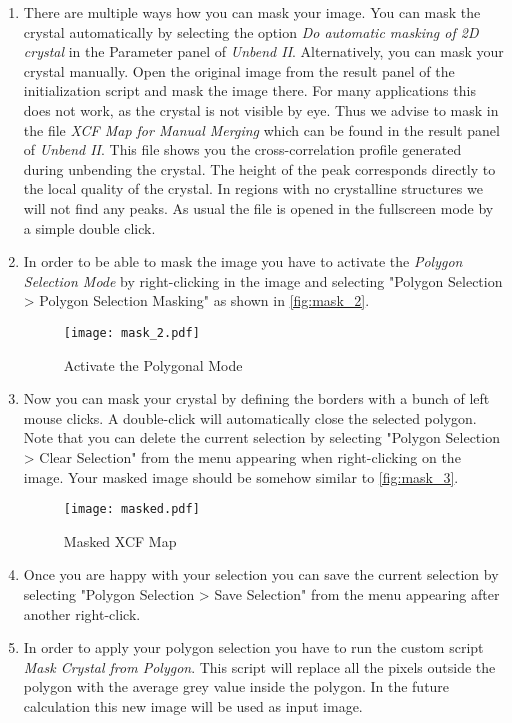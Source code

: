 \begin{enumerate}
	\item There are multiple ways how you can mask your image. You can mask the crystal automatically by selecting the option \textit{Do automatic masking of 2D crystal} in the Parameter panel of  \textit{Unbend II}. 
Alternatively, you can mask your crystal manually.  Open the original image from the result panel of the initialization script and mask the image there. For many applications this does not work, as the crystal is not visible by eye. Thus we advise to mask in the file \textit{XCF Map for Manual Merging} which can be found in the result panel of \textit{Unbend II}. This file shows you the cross-correlation profile generated during unbending the crystal. The height of the peak corresponds directly to the local quality of the crystal. In regions with no crystalline structures we will not find any peaks. As usual the file is opened in the fullscreen mode by a simple double click. 	
	\item In order to be able to mask the image you have to activate the \textit{Polygon Selection Mode} by right-clicking in the image and selecting "Polygon Selection > Polygon Selection Masking" as shown in \autoref{fig:mask_2}.

	\begin{figure}[H]
		\centering
		\texttt{[image: mask\_2.pdf]}
		\caption{Activate the Polygonal Mode}
		\label{fig:mask_2}
	\end{figure}
	
	\item Now you can mask your crystal by defining the borders with a bunch of left mouse clicks. A double-click will automatically close the selected polygon. Note that you can delete the current selection by selecting "Polygon Selection > Clear Selection" from the menu appearing when right-clicking on the image. Your masked image should be somehow similar to \autoref{fig:mask_3}.
	
	\begin{figure}[H]
		\centering
		\texttt{[image: masked.pdf]}
		\caption{Masked XCF Map}
		\label{fig:mask_3}
	\end{figure}
	
	\item Once you are happy with your selection you can save the current selection by selecting "Polygon Selection > Save Selection" from the menu appearing after another right-click.

	\item In order to apply your polygon selection you have to run the custom script \textit{Mask Crystal from Polygon}. This script will replace all the pixels outside the polygon with the average grey value inside the polygon. In the future calculation this new image will be used as input image.
	

\end{enumerate}
